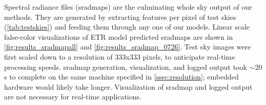 Spectral radiance files (sradmaps) are the culminating whole sky output of our methods. They are generated by extracting features per pixel of test skies (\autoref{tab:testskies}) and feeding them through any one of our models. Linear scale false-color visualizations of ETR model predicted sradmaps are shown in \autoref{fig:results_sradmapall} and \autoref{fig:results_sradmap_0726}. Test sky images were first scaled down to a resolution of 333x333 pixels, to anticipate real-time processing speeds. sradmap generation, visualization, and logged output took $\mathtt{\sim}$20 s to complete on the same machine specified in \autoref{ssec:resolution}; embedded hardware would likely take longer. Visualization of sradmap and logged output are not necessary for real-time applications.